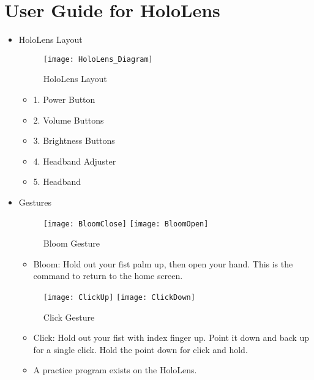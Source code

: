 \section{User Guide for HoloLens}
\begin{itemize}
    \item HoloLens Layout

    \begin{figure}[H]
    \texttt{[image: HoloLens\_Diagram]}
    \centering
    \caption{HoloLens Layout}
    \label{fig:HoloLens_Diagram}
    \end{figure}

    \begin{itemize}
        \item 1. Power Button
        \item 2. Volume Buttons
        \item 3. Brightness Buttons
        \item 4. Headband Adjuster
        \item 5. Headband
    \end{itemize}

    \item Gestures

    \begin{figure}[H]
        \centering
        \texttt{[image: BloomClose]}
        \texttt{[image: BloomOpen]}
        \caption{Bloom Gesture}
        \label{fig:BloomGesture}
    \end{figure}

        \begin{itemize}
            \item Bloom: Hold out your fist palm up, then open your hand. This is the command to return to the home screen.
        \end{itemize}

    \begin{figure}[H]
        \centering
        \texttt{[image: ClickUp]}
        \texttt{[image: ClickDown]}
        \caption{Click Gesture}
        \label{fig:ClickGesture}
    \end{figure}

    \begin{itemize}
        \item Click: Hold out your fist with index finger up. Point it down and back up for a single click. Hold the point down for click and hold.
        \item A practice program exists on the HoloLens.
    \end{itemize}


\end{itemize}
